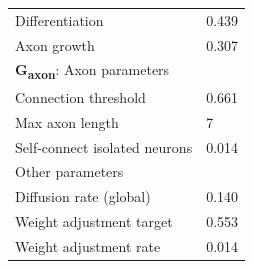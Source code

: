 \begin{table}[ht]
\begin{tabular}{ll}
\quad Differentiation & 0.439 \\
\quad Axon growth & 0.307 \\
\midrule
\textbf{G\textsubscript{axon}}: Axon parameters & \\
\quad Connection threshold & 0.661 \\
\quad Max axon length & 7 \\
\quad Self-connect isolated neurons & 0.014 \\
\midrule
Other parameters & \\
\quad Diffusion rate (global) & 0.140 \\
\quad Weight adjustment target & 0.553 \\
\quad Weight adjustment rate & 0.014 \\
\bottomrule
\end{tabular}
\end{table}